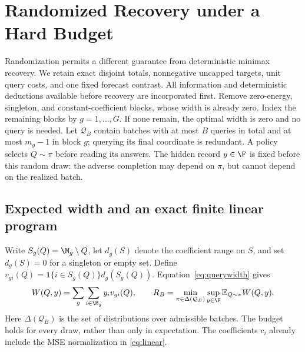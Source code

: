 \section{Randomized Recovery under a Hard Budget}
\label{sec:randomized-recovery}

Randomization permits a different guarantee from deterministic minimax
recovery. We retain exact disjoint totals, nonnegative uncapped targets,
unit query costs, and one fixed forecast contrast. All information and
deterministic deductions available before recovery are incorporated first.
Remove zero-energy, singleton, and constant-coefficient blocks, whose width
is already zero. Index the remaining blocks by $g=1,\ldots,G$.
If none remain, the optimal width is zero and no query is needed.
Let $\mathcal Q_B$ contain batches with at most $B$ queries in total and
at most $m_g-1$ in block $g$; querying its final coordinate is redundant.
A policy selects $Q\sim\pi$ before reading its answers. The hidden record
$y\in\F$ is fixed before this random draw: the adverse completion may
depend on $\pi$, but cannot depend on the realized batch.

\subsection{Expected width and an exact finite linear program}
Write $S_g(Q)=\M_g\setminus Q$, let $d_g(S)$ denote the coefficient range
on $S$, and set $d_g(S)=0$ for a singleton or empty set. Define
$v_{gi}(Q)=\boldsymbol{1}\{i\in S_g(Q)\}d_g(S_g(Q))$.
Equation~\eqref{eq:querywidth} gives
\begin{equation}
 W(Q,y)=\sum_g\sum_{i\in\M_g}y_i v_{gi}(Q),\qquad
 R_B=\min_{\pi\in\Delta(\mathcal Q_B)}\sup_{y\in\F}
       \mathbb E_{Q\sim\pi}W(Q,y).
 \label{eq:random-objective}
\end{equation}
Here $\Delta(\mathcal Q_B)$ is the set of distributions over admissible
batches. The budget holds for every draw, rather than only in expectation.
The coefficients $c_i$ already include the MSE normalization in
\eqref{eq:linear}.

